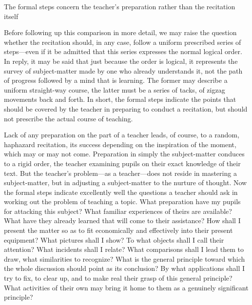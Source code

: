 \documentclass[showtrims,ustradepaper]{memoir}
\begin{document}
The formal steps concern the teacher's preparation rather than the
recitation itself

Before following up this comparison in more detail, we may raise the
question whether the recitation should, in any case, follow a uniform
prescribed series of steps---even if it be admitted that this series
expresses the normal logical order. In reply, it may be said that just
because the order is logical, it represents the survey of subject-matter
made by one who already understands it, not the path of progress
followed by a mind that is learning. The former may describe a uniform
straight-way course, the latter must be a series of tacks, of zigzag
movements back and forth. In short, the formal steps indicate the points
that should be covered by the teacher in preparing to conduct a
recitation, but should not prescribe the actual course of teaching.


Lack of any preparation on the part of a teacher leads, of course, to a
random, haphazard recitation, its success depending on the inspiration
of the moment, which may or may not come. Preparation in simply the
subject-matter conduces to a rigid order, the teacher examining pupils
on their exact knowledge of their text. But the teacher's problem---as a
teacher---does not reside in mastering a subject-matter, but in
adjusting a subject-matter to the nurture of thought. Now
the
formal steps indicate excellently well the questions a teacher should
ask in working out the problem of teaching a topic. What preparation
have my pupils for attacking this subject? What familiar experiences of
theirs are available? What have they already learned that will come to
their assistance? How shall I present the matter so as to fit
economically and effectively into their present equipment? What pictures
shall I show? To what objects shall I call their attention? What
incidents shall I relate? What comparisons shall I lead them to draw,
what similarities to recognize? What is the general principle toward
which the whole discussion should point as its conclusion? By what
applications shall I try to fix, to clear up, and to make real their
grasp of this general principle? What activities of their own may bring
it home to them as a genuinely significant principle?


\end{document}
